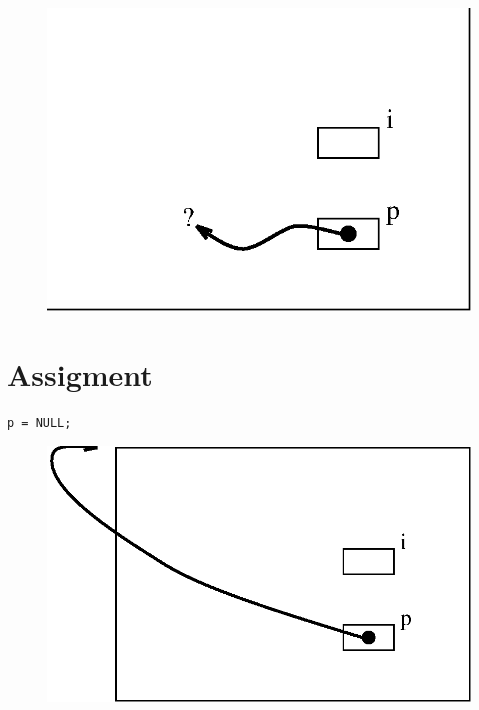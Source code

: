 \documentclass[a4,portraitt]{slides}
\begin{document}
\newpage
{\samepage
\begin{center}
\begin{figure}[h]
\centerline{
\includegraphics{../Figs/point8_1.eps}
}
\end{figure}
\end{center}
\vspace{-1in}
\section*{Assigment}
\begin{verbatim}
p = NULL;
\end{verbatim}
\begin{center}
\begin{figure}[h]
\centerline{
\includegraphics{../Figs/point8_2.eps}
}
\end{figure}
\end{center}
}
\newpage
\end{document}
